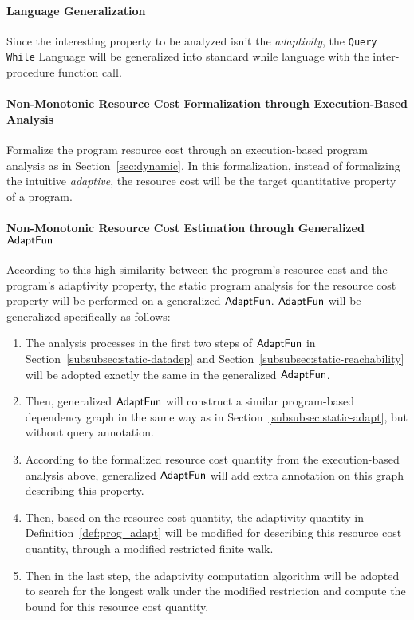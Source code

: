 \paragraph*{Language Generalization} Since the interesting property 
to be analyzed isn't the \emph{adaptivity},
the {\tt Query While} Language will be generalized into standard while language with the inter-procedure function call.
\paragraph*{Non-Monotonic Resource Cost Formalization through Execution-Based Analysis} 
Formalize the program resource cost through an execution-based program analysis as in Section~\ref{sec:dynamic}.
In this formalization, instead of formalizing the intuitive \emph{adaptive}, the resource cost will be the
target quantitative property of a program.
\paragraph*{Non-Monotonic Resource Cost Estimation through Generalized $\textsf{AdaptFun}$}
According to this high similarity between the program's resource cost and the 
program's adaptivity property, the static program analysis for the resource cost property will 
be performed on a generalized $\textsf{AdaptFun}$. $\textsf{AdaptFun}$ will be generalized specifically as follows:
\begin{enumerate}
 \item The analysis processes in the first two steps of $\textsf{AdaptFun}$ in Section~\ref{subsubsec:static-datadep}
 and Section~\ref{subsubsec:static-reachability} will be adopted exactly the same in the generalized $\textsf{AdaptFun}$.
 \item Then, generalized $\textsf{AdaptFun}$ will construct a similar program-based dependency graph 
 in the same way as in Section~\ref*{subsubsec:static-adapt}, but without query annotation. 
 \item According to the formalized resource cost quantity from the execution-based analysis above,
 generalized $\textsf{AdaptFun}$ will add extra annotation on this graph describing this property.
 \item Then, based on the resource cost quantity, the adaptivity quantity in Definition~\ref{def:prog_adapt}
 will be modified for describing this resource cost quantity, through a modified restricted finite walk.
 \item Then in the last step, the adaptivity computation algorithm will be adopted to search for the longest 
 walk under the modified restriction and compute the bound for 
 this resource cost quantity.
\end{enumerate}


